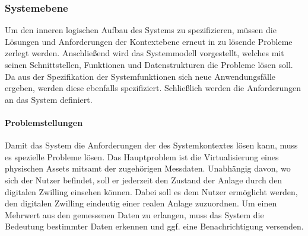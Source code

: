 \newpage

\subsubsection{Systemebene}
Um den inneren logischen Aufbau des Systems zu spezifizieren, müssen die Lösungen und Anforderungen der Kontextebene erneut in zu lösende Probleme zerlegt werden. Anschließend wird das Systemmodell vorgestellt, welches mit seinen Schnittstellen, Funktionen und Datenstrukturen die Probleme lösen soll. Da aus der Spezifikation der Systemfunktionen sich neue Anwendungsfälle ergeben, werden diese ebenfalls spezifiziert. Schließlich werden die Anforderungen an das System definiert.

\paragraph{Problemstellungen} Damit das System die Anforderungen der des Systemkontextes lösen kann, muss es spezielle Probleme lösen. Das Hauptproblem ist die Virtualisierung eines physischen Assets mitsamt der zugehörigen Messdaten. Unabhängig davon, wo sich der Nutzer befindet, soll er jederzeit den Zustand der Anlage durch den digitalen Zwilling einsehen können. Dabei soll es dem Nutzer ermöglicht werden, den digitalen Zwilling eindeutig einer realen Anlage zuzuordnen. Um einen Mehrwert aus den gemessenen Daten zu erlangen, muss das System die Bedeutung bestimmter Daten erkennen und ggf. eine Benachrichtigung versenden.

